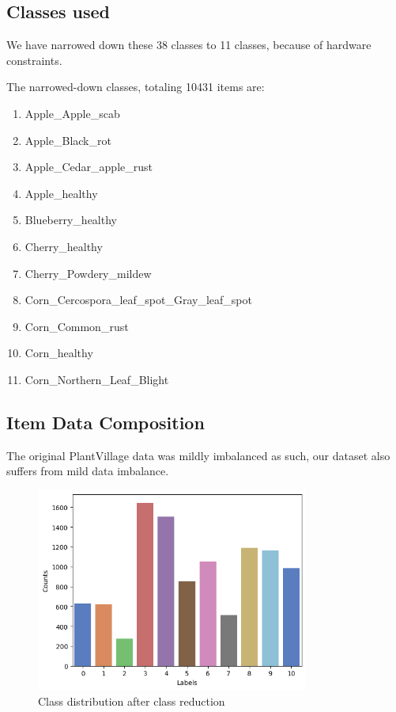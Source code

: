     \vspace{1em}

    \subsection{Classes used}
    We have narrowed down these 38 classes to 11 classes, because of hardware constraints.\par \vspace{1em}

    
    
    The narrowed-down classes, totaling 10431 items are:

    \begin{multicols}{2}
    \begin{enumerate}
    \item Apple\_Apple\_scab
    \item Apple\_Black\_rot
    \item Apple\_Cedar\_apple\_rust
    \item Apple\_healthy
    \item Blueberry\_healthy
    \item Cherry\_healthy
    \item Cherry\_Powdery\_mildew
    \item Corn\_Cercospora\_leaf\_spot\_Gray\_leaf\_spot
    \item Corn\_Common\_rust
    \item Corn\_healthy
    \item Corn\_Northern\_Leaf\_Blight
    \end{enumerate}
    \end{multicols}

    \subsection{Item Data Composition}
    The original PlantVillage data was mildly imbalanced as such, our dataset also suffers from mild data imbalance.

    \begin{figure}
        \includegraphics[width=0.8\textwidth, center]{graphics/chapter 4/Image_Classifications.png}
        \caption{Class distribution after class reduction}
    \end{figure}
     \par \vspace{1em}
     
